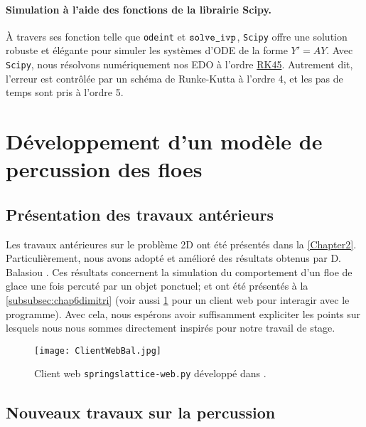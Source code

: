  
\paragraph{Simulation à l'aide des fonctions de la librairie Scipy.} À travers ses fonction telle que \texttt{odeint} et $\verb|solve_ivp|$, \texttt{Scipy} offre une solution robuste et élégante pour simuler les systèmes d'ODE de la forme $Y' = AY$. Avec \texttt{Scipy}, nous résolvons numériquement nos EDO à l'ordre \href{https://docs.scipy.org/doc/scipy/reference/generated/scipy.integrate.solve_ivp.html}{RK45}. Autrement dit, l'erreur est contrôlée par un schéma de Runke-Kutta à l'ordre 4, et les pas de temps sont pris à l'ordre 5.







\section{Développement d'un modèle de percussion des floes}




\subsection{Présentation des travaux antérieurs}




Les travaux antérieures sur le problème 2D ont été présentés dans la 
\cref{Chapter2}. Particulièrement, nous avons adopté et amélioré des résultats obtenus par D. Balasiou \parencite{balasoiu2020halthesis}. Ces résultats concernent la simulation du comportement d'un floe de glace une fois percuté par un objet ponctuel; et ont été présentés à la \cref{subsubsec:chap6dimitri} (voir aussi \cref{fig:clientwebbal} pour un client web pour interagir avec le programme). Avec cela, nous espérons avoir suffisamment expliciter les points sur lesquels nous nous sommes directement inspirés pour notre travail de stage.
\begin{figure}[!h]
    \centering
    \texttt{[image: ClientWebBal.jpg]}
    \caption{Client web \texttt{springslattice-web.py} développé dans \parencite[p.197]{balasoiu2020halthesis}.}
    \label{fig:clientwebbal}
\end{figure}




\subsection{Nouveaux travaux sur la percussion}



